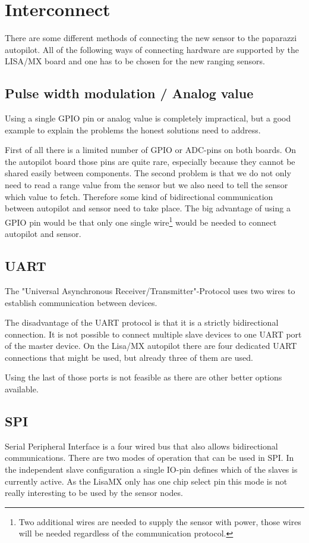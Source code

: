 \section{Interconnect}
There are some different methods of connecting the new sensor to the paparazzi autopilot.
All of the following ways of connecting hardware are supported by the LISA/MX board and one has to be chosen for the new ranging sensors.

\subsection{Pulse width modulation / Analog value}
Using a single GPIO pin or analog value is completely impractical, but a good example to explain the problems the honest solutions need to address.

First of all there is a limited number of GPIO or ADC-pins on both boards.
On the autopilot board those pins are quite rare, especially because they cannot be shared easily between components.
The second problem is that we do not only need to read a range value from the sensor but we also need to tell the sensor which value to fetch.
Therefore some kind of bidirectional communication between autopilot and sensor need to take place.
The big advantage of using a GPIO pin would be that only one single wire\footnote{Two additional wires are needed to supply the sensor with power, those wires will be needed regardless of the communication protocol.} would be needed to connect autopilot and sensor.

\subsection{UART}
The "Universal Asynchronous Receiver/Transmitter"-Protocol uses two wires to establish communication between devices.
\cite{wingen_automatic_2004}

The disadvantage of the UART protocol is that it is a strictly bidirectional connection.
It is not possible to connect multiple slave devices to one UART port of the master device.
On the Lisa/MX autopilot there are four dedicated UART connections that might be used, but already three of them are used.

Using the last of those ports is not feasible as there are other better options available.

\subsection{SPI}
Serial Peripheral Interface is a four wired bus that also allows bidirectional communications.
There are two modes of operation that can be used in SPI.
In the independent slave configuration a single IO-pin defines which of the slaves is currently active.
As the LisaMX only has one chip select pin this mode is not really interesting to be used by the sensor nodes.


